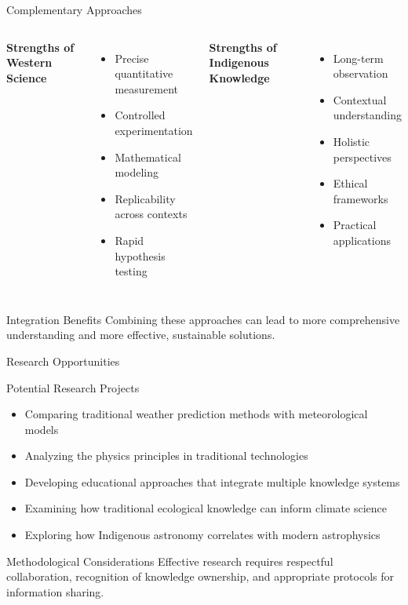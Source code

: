 \documentclass{beamer}
\begin{document}
\begin{frame}{Complementary Approaches}
    \begin{columns}
        \textbf{Strengths of Western Science}
        \begin{itemize}
            \item Precise quantitative measurement
            \item Controlled experimentation
            \item Mathematical modeling
            \item Replicability across contexts
            \item Rapid hypothesis testing
        \end{itemize}
        
        \textbf{Strengths of Indigenous Knowledge}
        \begin{itemize}
            \item Long-term observation
            \item Contextual understanding
            \item Holistic perspectives
            \item Ethical frameworks
            \item Practical applications
        \end{itemize}
    \end{columns}
    
    \begin{block}{Integration Benefits}
        Combining these approaches can lead to more comprehensive understanding and more effective, sustainable solutions.
    \end{block}
\end{frame}

\begin{frame}{Research Opportunities}
    \begin{block}{Potential Research Projects}
        \begin{itemize}
            \item Comparing traditional weather prediction methods with meteorological models
            \item Analyzing the physics principles in traditional technologies
            \item Developing educational approaches that integrate multiple knowledge systems
            \item Examining how traditional ecological knowledge can inform climate science
            \item Exploring how Indigenous astronomy correlates with modern astrophysics
        \end{itemize}
    \end{block}
    
    \begin{alertblock}{Methodological Considerations}
        Effective research requires respectful collaboration, recognition of knowledge ownership, and appropriate protocols for information sharing.
    \end{alertblock}
\end{frame}
\end{document}
